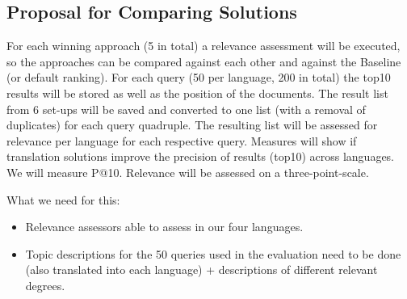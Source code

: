 \documentclass[a4paper,11pt]{article}
\begin{document}
\subsection{Proposal for Comparing Solutions}
For each winning approach (5 in total) a relevance assessment will be executed, so the approaches can be compared against each other and against the Baseline (or default ranking). For each query (50 per language, 200 in total) the top10 results will be stored as well as the position of the documents. The result list from 6 set-ups will be saved and converted to one list (with a removal of duplicates) for each query quadruple. The resulting list will be assessed for relevance per language for each respective query. Measures will show if translation solutions improve the precision of results (top10) across languages. We will measure P@10. Relevance will be assessed on a three-point-scale. 
 
What we need for this:
\begin{itemize}
\item Relevance assessors able to assess in our four languages.
\item Topic descriptions for the 50 queries used in the evaluation need to be done (also translated into each language) + descriptions of different relevant degrees. 
\end{itemize}


%
%


\end{document}
